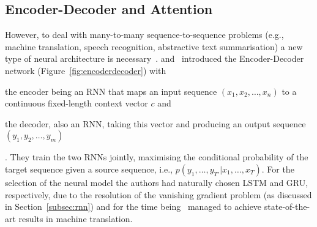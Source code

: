 \subsection{Encoder-Decoder and Attention}\label{subsec:seq2seq}
However, to deal with many-to-many sequence-to-sequence problems (e.g., machine translation, speech recognition, abstractive text summarisation) a new type of neural architecture is necessary~\cite{sutskever2014sequence}.
and~\cite{cho-etal-2014-learning} introduced the Encoder-Decoder network (Figure~\ref{fig:encoderdecoder}) with \begin{enumerate*}
    \item the encoder being an RNN that maps an input sequence $(x_1, x_2, \dots, x_n)$ to a continuous fixed-length context vector $c$ and
    \item the decoder, also an RNN, taking this vector and producing an output sequence $(y_1, y_2, \dots, y_m)$
\end{enumerate*}.
They train the two RNNs jointly, maximising the conditional probability of the target sequence given a source sequence, i.e., $p(y_1, \ldots, y_{T'} | x_1, \ldots, x_T)$.
For the selection of the neural model the authors had naturally chosen LSTM and GRU, respectively, due to the resolution of the vanishing gradient problem (as discussed in Section~\ref{subsec:rnn}) and for the time being~\cite{sutskever2014sequence} managed to achieve state-of-the-art results in machine translation.


